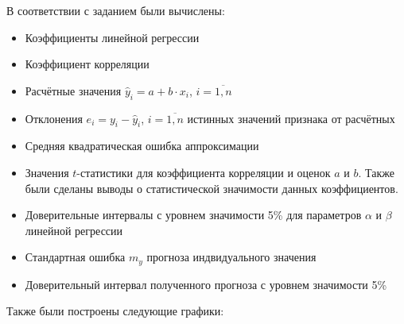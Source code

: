 В соответствии с заданием были вычислены:

\begin{itemize}
	\item Коэффициенты линейной регрессии
	\item Коэффициент корреляции
	\item Расчётные значения $\hat{y}_i = a + b \cdot x_i$, $i = \overline{1,n}$
	\item Отклонения $e_i = y_i - \hat{y}_i$, $i = \overline{1, n}$ истинных значений признака от расчётных
	\item Средняя квадратическая ошибка аппроксимации
	\item Значения $t$-статистики для коэффициента корреляции и оценок $a$ и $b$. Также были сделаны выводы о статистической значимости данных коэффициентов.
	\item Доверительные интервалы с уровнем значимости 5\% для параметров $\alpha$ и $\beta$ линейной регрессии
	\item Стандартная ошибка $m_y$ прогноза индвидуального значения
	\item Доверительный интервал полученного прогноза с уровнем значимости 5\%
	
\end{itemize}

Также были построены следующие графики:

